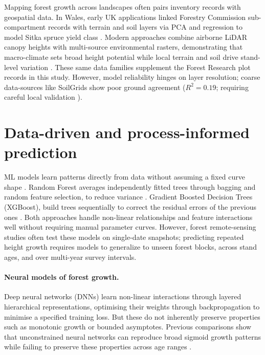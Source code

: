 \documentclass[logo,msc,ai]{infthesis}           %
\begin{document}
Mapping forest growth across landscapes often pairs inventory records with geospatial data. In Wales, early UK applications linked Forestry Commission sub-compartment records with terrain and soil layers via PCA and regression to model Sitka spruce yield class \cite{bateman1998Using_C1_SS}. Modern approaches combine airborne LiDAR canopy heights with multi-source environmental rasters, demonstrating that macro-climate sets broad height potential while local terrain and soil drive stand-level variation \cite{fricker2019More_C3_LID}. These same data families supplement the Forest Research plot records in this study. However, model reliability hinges on layer resolution; coarse data-sources like SoilGrids show poor ground agreement ($R^2 = 0.19$; requiring careful local validation \cite{miller2024Assessing_C2_CR}).

\section{Data-driven and process-informed prediction} \label{sec:background-prediction}
ML models learn patterns directly from data without assuming a fixed curve shape \cite{lee2018Machine_C3_LID}. Random Forest averages independently fitted trees through bagging and random feature selection, to reduce variance \cite{breiman2001RandomForest_C4_NN}. Gradient Boosted Decision Trees (XGBoost), build trees sequentially to correct the residual errors of the previous ones \cite{chen2016XGBoost_C4_NN}. Both approaches handle non-linear relationships and feature interactions well without requiring manual parameter curves. However, forest remote-sensing studies often test these models on single-date snapshots; predicting repeated height growth requires models to generalize to unseen forest blocks, across stand ages, and over multi-year survey intervals.

\paragraph*{Neural models of forest growth.}
Deep neural networks (DNNs) learn non-linear interactions through layered hierarchical representations, optimising their weights through backpropagation to minimise a specified training loss. But these do not inherently preserve properties such as monotonic growth or bounded asymptotes. Previous comparisons show that unconstrained neural networks can reproduce broad sigmoid growth patterns while failing to preserve these properties across age ranges \cite{ercanli2023Comparison_C4_NN, karatepe2022Total_C4_NN}.
\end{document}
